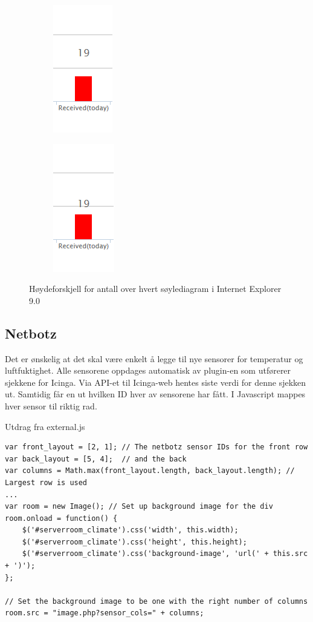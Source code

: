 \begin{figure}[H]
\centering
\begin{subfigure}
  \centering
  \includegraphics[scale=0.7]{img/IE_footprints_bug}
\end{subfigure}
\begin{subfigure}
  \centering
  \includegraphics[scale=0.7]{img/IE_footprints_fix}
\end{subfigure}
\caption{Høydeforskjell for antall over hvert søylediagram i Internet Explorer 9.0}
\label{IE_bug}
\end{figure}

\subsection{Netbotz}
Det er ønskelig at det skal være enkelt å legge til nye sensorer for temperatur og luftfuktighet. Alle sensorene oppdages automatisk av plugin-en som utførerer sjekkene for Icinga. Via API-et til Icinga-web hentes siste verdi for denne sjekken ut. Samtidig får en ut hvilken ID hver av sensorene har fått. I Javascript mappes hver sensor til riktig rad.

Utdrag fra external.js
\begin{lstlisting}[style=example]
var front_layout = [2, 1]; // The netbotz sensor IDs for the front row
var back_layout = [5, 4];  // and the back
var columns = Math.max(front_layout.length, back_layout.length); // Largest row is used 
...
var room = new Image(); // Set up background image for the div
room.onload = function() {
    $('#serverroom_climate').css('width', this.width);
    $('#serverroom_climate').css('height', this.height);
    $('#serverroom_climate').css('background-image', 'url(' + this.src + ')');
};

// Set the background image to be one with the right number of columns
room.src = "image.php?sensor_cols=" + columns;
\end{lstlisting}


